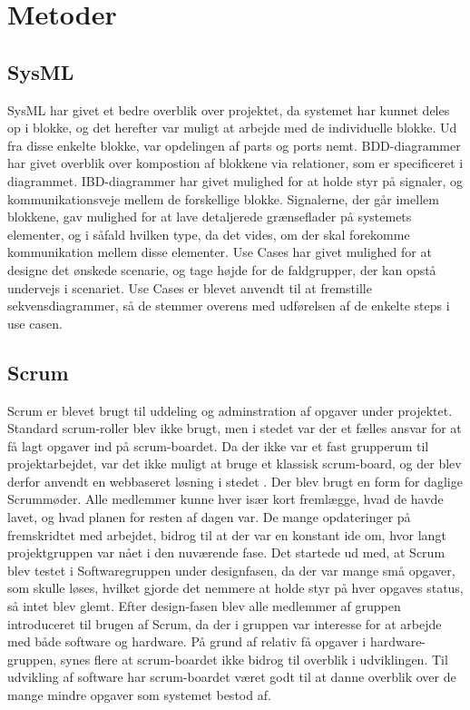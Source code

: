 \section{Metoder}

\subsection{SysML}
SysML har givet et bedre overblik over projektet, da systemet har kunnet deles op i blokke, og det herefter var muligt at arbejde med de individuelle blokke. Ud fra disse enkelte blokke, var opdelingen af parts og ports nemt. 
BDD-diagrammer har givet overblik over kompostion af blokkene via relationer, som er specificeret i diagrammet.
IBD-diagrammer har givet mulighed for at holde styr på signaler, og kommunikationsveje mellem de forskellige blokke. Signalerne, der går imellem blokkene, gav mulighed for at lave detaljerede grænseflader på systemets elementer, og i såfald hvilken type, da det vides, om der skal forekomme kommunikation mellem disse elementer. 
Use Cases har givet mulighed for at designe det ønskede scenarie, og tage højde for de faldgrupper, der kan opstå undervejs i scenariet. Use Cases er blevet anvendt til at fremstille sekvensdiagrammer, så de stemmer overens med udførelsen af de enkelte steps i use casen.

\subsection{Scrum}
Scrum er blevet brugt til uddeling og adminstration af opgaver under projektet. Standard scrum-roller blev ikke brugt, men i stedet var der et fælles ansvar for at få lagt opgaver ind på scrum-boardet. Da der ikke var et fast grupperum til projektarbejdet, var det ikke muligt at bruge et klassisk scrum-board, og der blev derfor anvendt en webbaseret løsning i stedet  \cite{lib:Axosoft}. Der blev brugt en form for daglige Scrummøder. Alle medlemmer kunne hver især kort fremlægge, hvad de  havde lavet, og hvad planen for resten af dagen var. De mange opdateringer på fremskridtet med arbejdet, bidrog til at der var en konstant ide om, hvor langt projektgruppen var nået i den nuværende fase. Det startede ud med, at Scrum blev testet i Softwaregruppen under designfasen, da der var mange små opgaver, som skulle løses, hvilket gjorde det nemmere at holde styr på hver opgaves status, så intet blev glemt. Efter design-fasen blev alle medlemmer af gruppen introduceret til brugen af Scrum, da der i gruppen var interesse for at arbejde med både software og hardware.
På grund af relativ få opgaver i hardware-gruppen, synes flere at scrum-boardet ikke bidrog til overblik i udviklingen. Til udvikling af software har scrum-boardet været godt til at danne overblik over de mange mindre opgaver som systemet bestod af.

